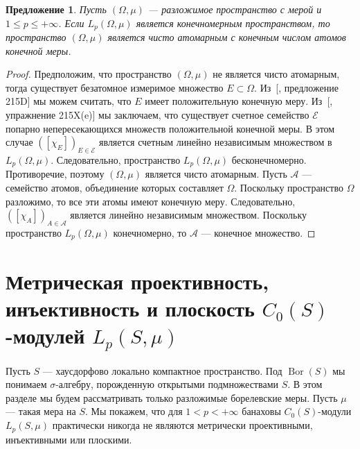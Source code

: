 \documentclass[12pt]{article}
\newtheorem{proposition}[theorem]{Предложение}
\begin{document}
\begin{proposition}\label{LpFinDimCharac}
    Пусть $(\Omega,\mu)$ --- разложимое пространство с мерой 
    и $1\leq p\leq+\infty$. Если $L_p(\Omega,\mu)$ является конечномерным 
    пространством, то пространство $(\Omega,\mu)$ является чисто атомарным с 
    конечным числом атомов конечной меры.
\end{proposition} 
\begin{proof}
    Предположим, что пространство $(\Omega,\mu)$ не является чисто атомарным, 
    тогда существует безатомное измеримое множество $E\subset \Omega$. 
    Из~[\cite{FremMeasTh2}, предложение 215D] мы можем считать, что $E$ имеет 
    положительную конечную меру. Из~[\cite{FremMeasTh2}, упражнение 215X(e)] мы 
    заключаем, что существует счетное семейство $\mathcal{E}$ попарно 
    непересекающихся множеств положительной конечной меры. В этом 
    случае $([\chi_{E}])_{E\in\mathcal{E}}$ является счетным линейно независимым 
    множеством в $L_p(\Omega,\mu)$. Следовательно, пространство 
    $L_p(\Omega,\mu)$  бесконечномерно. Противоречие, поэтому $(\Omega,\mu)$ 
    является чисто атомарным. Пусть $\mathcal{A}$ --- семейство атомов, 
    объединение которых составляет $\Omega$. Поскольку пространство $\Omega$ 
    разложимо, то все эти атомы имеют конечную меру. 
    Следовательно, $([\chi_{A}])_{A\in\mathcal{A}}$ 
    является линейно независимым множеством. Поскольку 
    пространство $L_p(\Omega,\mu)$ конечномерно, 
    то $\mathcal{A}$ --- конечное множество.
\end{proof}


\section{Метрическая проективность, инъективность и плоскость 
\texorpdfstring{$C_0(S)$}{C0(S)}-модулей 
\texorpdfstring{$L_p(S,\mu)$}{LpSmu}}
\label{MetrProInjFltOfC0SModLp}

Пусть $S$ --- хаусдорфово локально компактное пространство. 
Под $\operatorname{Bor}(S)$ мы понимаем $\sigma$-алгебру, порожденную открытыми 
подмножествами $S$. В этом разделе мы будем рассматривать только разложимые 
борелевские меры. Пусть $\mu$ --- такая мера на $S$. Мы покажем, что 
для $1<p<+\infty$ банаховы $C_0(S)$-модули $L_p(S,\mu)$ практически никогда не 
являются метрически проективными, инъективными или плоскими. 
\end{document}
